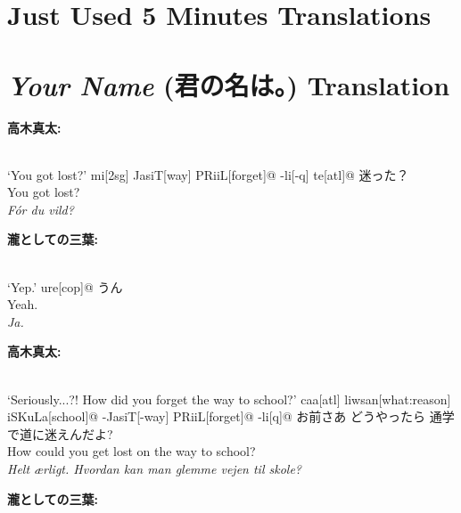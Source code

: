 
\chapter{Just Used 5 Minutes Translations}


\chapter{\textit{Your Name} (君の名は。) Translation}

\begin{paracol}{2}
\hfill \textbf{高木真太:}

\switchcolumn

\exdisplay[lingstyle=Conversation]
\begingl 
\glpreamble
\textbf{}\\
`You got lost?'
\endpreamble
mi[\sc 2sg]
JasiT[way]
PRiiL[forget]@
-li[\sc -q]
te[\sc atl]@
\glft
迷った？\\
You got lost?\\
\textit{Fór du vild?}
\endgl
\xe

\bigskip
\switchcolumn*
\hfill \textbf{瀧としての三葉:}

\switchcolumn

\exdisplay[lingstyle=Conversation]
\begingl 
\glpreamble
\textbf{}\\
`Yep.'
\endpreamble
ure[\sc cop]@
\glft
うん\\
Yeah.\\
\textit{Ja.}
\endgl
\xe

\bigskip
\switchcolumn*
\hfill \textbf{高木真太:}

\switchcolumn

\exdisplay[lingstyle=Conversation]
\begingl 
\glpreamble
\textbf{}\\
`Seriously...?! How did you forget the way to school?'
\endpreamble
caa[\sc atl]
liwsan[what:reason]
iSKuLa[school]@
-JasiT[-way]
PRiiL[forget]@
-li[\sc q]@
\glft
お前さあ どうやったら 通学で道に迷えんだよ?\\
How could you get lost on the way to school?\\
\textit{Helt ærligt. Hvordan kan man glemme vejen til skole?}
\endgl
\xe

\bigskip
\switchcolumn*
\hfill \textbf{瀧としての三葉:}


\end{paracol}
